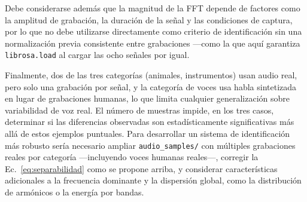 Debe considerarse además que la magnitud de la FFT depende de factores como la amplitud de grabación, la duración de la señal y las condiciones de captura, por lo que no debe utilizarse directamente como criterio de identificación sin una normalización previa consistente entre grabaciones —como la que aquí garantiza \texttt{librosa.load} al cargar las ocho señales por igual.

Finalmente, dos de las tres categorías (animales, instrumentos) usan audio real, pero solo una grabación por señal, y la categoría de voces usa habla sintetizada en lugar de grabaciones humanas, lo que limita cualquier generalización sobre variabilidad de voz real. El número de muestras impide, en los tres casos, determinar si las diferencias observadas son estadísticamente significativas más allá de estos ejemplos puntuales. Para desarrollar un sistema de identificación más robusto sería necesario ampliar \texttt{audio\_samples/} con múltiples grabaciones reales por categoría —incluyendo voces humanas reales—, corregir la Ec.~\ref{eq:separabilidad} como se propone arriba, y considerar características adicionales a la frecuencia dominante y la dispersión global, como la distribución de armónicos o la energía por bandas.
